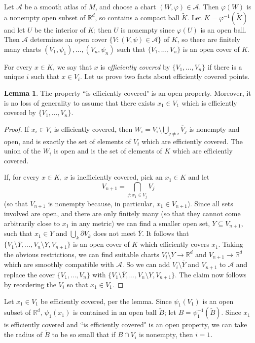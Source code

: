 \documentclass[10pt]{article}
\newcommand{\RR}{\mathbb{R}}
\theoremstyle{definition}
\newtheorem{lemma}{Lemma}[exer]
\begin{document}
Let $\mathcal A$ be a smooth atlas of $M$, and choose a chart $(W, \varphi) \in \mathcal A$.
Then $\varphi(W)$ is a nonempty open subset of $\RR^d$, so contains a compact ball $\tilde K$.
Let $K = \varphi^{-1}(\tilde K)$ and let $U$ be the interior of $K$; then $U$ is nonempty since $\varphi(U)$ is an open ball.
Then $\mathcal A$ determines an open cover $\{V: (V, \psi) \in \mathcal A\}$ of $K$, so there are finitely many charts $(V_1, \psi_1), \dots, (V_n, \psi_n)$ such that $\{V_1, \dots, V_n\}$ is an open cover of $K$.

For every $x \in K$, we say that $x$ is \emph{efficiently covered} by $\{V_1, \dots, V_n\}$ if there is a unique $i$ such that $x \in V_i$.
Let us prove two facts about efficiently covered points.
\begin{lemma}
The property ``is efficiently covered" is an open property.
Moreover, it is no loss of generality to assume that there exists $x_1 \in V_1$ which is efficiently covered by $\{V_1, \dots, V_n\}$.
\end{lemma}
\begin{proof}
If $x_i \in V_i$ is efficiently covered, then $W_i = V_i \setminus \bigcup_{j\neq i} \overline V_j$ is nonempty and open, and is exactly the set of elements of $V_i$ which are efficiently covered.
The union of the $W_i$ is open and is the set of elements of $K$ which are efficiently covered.

If, for every $x \in K$, $x$ is inefficiently covered, pick an $x_1 \in K$ and let
$$V_{n+1} = \bigcap_{j:x_1 \in V_j} V_j$$
(so that $V_{n+1}$ is nonempty because, in particular, $x_1 \in V_{n+1}$).
Since all sets involved are open, and there are only finitely many (so that they cannot come arbitrarily close to $x_1$ in any metric) we can find a smaller open set, $Y \subseteq V_{n+1}$, such that $x_1 \in Y$ and $\bigcup_k \partial V_k$ does not meet $\overline Y$.
It follows that $\{V_1 \setminus \overline Y, \dots, V_n \setminus Y, V_{n+1}\}$ is an open cover of $K$ which efficiently covers $x_1$.
Taking the obvious restrictions, we can find suitable charts $V_i \setminus \overline Y \to \RR^d$ and $V_{n+1} \to \RR^d$ which are smoothly compatible with $\mathcal A$.
So we can add $V_i \setminus \overline Y$ and $V_{n+1}$ to $\mathcal A$ and replace the cover $\{V_1, \dots, V_n\}$ with $\{V_1 \setminus \overline Y, \dots, V_n \setminus Y, V_{n+1}\}$.
The claim now follows by reordering the $V_i$ so that $x_1 \in V_1$.
\end{proof}

Let $x_1 \in V_1$ be efficiently covered, per the lemma.
Since $\psi_1(V_1)$ is an open subset of $\RR^d$, $\psi_1(x_1)$ is contained in an open ball $\tilde B$; let $B = \psi_1^{-1}(\tilde B)$.
Since $x_1$ is efficiently covered and ``is efficiently covered" is an open property, we can take the radius of $\tilde B$ to be so small that if $B \cap V_i$ is nonempty, then $i = 1$.
\end{document}
